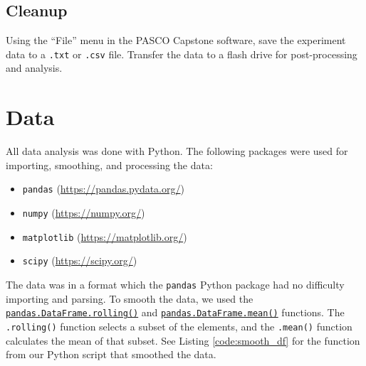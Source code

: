 \documentclass[12 pt]{report}
\begin{document}
\subsection{Cleanup} \label{procedures-cleanup}
Using the ``File'' menu in the PASCO Capstone software, save the experiment data to a \texttt{.txt} or \texttt{.csv} file. Transfer the data to a flash drive for post-processing and analysis.

\section{Data} \label{data}
All data analysis was done with Python. The following packages were used for importing, smoothing, and processing the data:

\begin{itemize}
	\item \texttt{pandas} (\url{https://pandas.pydata.org/})
	\item \texttt{numpy} (\url{https://numpy.org/})
	\item \texttt{matplotlib} (\url{https://matplotlib.org/})
	\item \texttt{scipy} (\url{https://scipy.org/})
\end{itemize}

The data was in a  format which the \texttt{pandas} Python package had no difficulty importing and parsing. To smooth the data, we used the \href{https://pandas.pydata.org/pandas-docs/stable/reference/api/pandas.DataFrame.rolling.html}{\texttt{pandas.DataFrame.rolling()}} and \href{https://pandas.pydata.org/pandas-docs/stable/reference/api/pandas.DataFrame.mean.html}{\texttt{pandas.DataFrame.mean()}} functions. The \texttt{.rolling()} function selects a subset of the elements, and the \texttt{.mean()} function calculates the mean of that subset. See Listing \ref{code:smooth_df} for the function from our Python script that smoothed the data.


\end{document}
